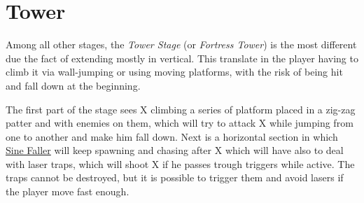 \section{Tower}
Among all other stages, the \textit{Tower Stage} (or \textit{Fortress Tower}) is the most different due the fact of extending mostly in vertical. This translate in the player having to climb it via wall-jumping or using moving platforms, with the risk of being hit and fall down at the beginning.

The first part of the stage sees X climbing a series of platform placed in a zig-zag patter and with enemies on them, which will try to attack X while jumping from one to another and make him fall down. Next is a horizontal section in which \hyperlink{enem:Sine_Faller}{Sine Faller} will keep spawning and chasing after X which will have also to deal with laser traps, which will shoot X if he passes trough triggers while active. The traps cannot be destroyed, but it is possible to trigger them and avoid lasers if the player move fast enough. 

